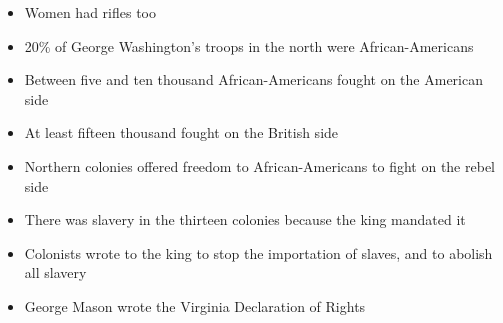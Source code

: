 \documentclass[12pt]{article}
\begin{document}
\begin{itemize}
\begin{itemize}
    \end{itemize}

  \item Women had rifles too

  \item 20\% of George Washington's troops in the north were African-Americans

  \item Between five and ten thousand African-Americans fought on the American side

  \item At least fifteen thousand fought on the British side

  \item Northern colonies offered freedom to African-Americans to fight on the rebel side

  \item There was slavery in the thirteen colonies because the king mandated it

  \item Colonists wrote to the king to stop the importation of slaves, and to abolish all slavery

  \item George Mason wrote the Virginia Declaration of Rights

\end{itemize}
\end{document}
